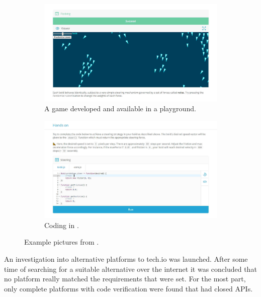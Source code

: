 \begin{figure}[h]
    \begin{subfigure}{.45\linewidth}
        \includegraphics[width=\linewidth]{img/techio_game.jpg}
        \caption{A game developed and available in a \techio{} playground.}
    \end{subfigure}
    \hfill
    \begin{subfigure}{.45\linewidth}
        \includegraphics[width=\linewidth]{img/techio_handson.jpg}
        \caption{Coding in \techio.}
    \end{subfigure}
    \caption{Example pictures from \techio.}
\end{figure}

An investigation into alternative platforms to tech.io was launched. After some time of searching for a suitable alternative over the internet it was concluded that no platform really matched the requirements that were set. For the most part, only complete platforms with code verification were found that had closed APIs.

